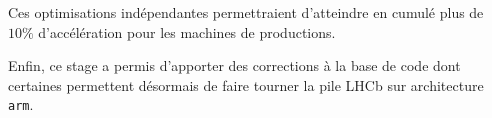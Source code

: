 \documentclass[a4paper,11pt]{report}
\begin{document}
Ces optimisations indépendantes permettraient d'atteindre en cumulé plus de $10\%$ d'accélération pour les machines de productions.

Enfin, ce stage a permis d'apporter des corrections à la base de code dont certaines permettent désormais de faire tourner la pile LHCb sur architecture \verb'arm'.

\printbibliography
{}
\end{document}
